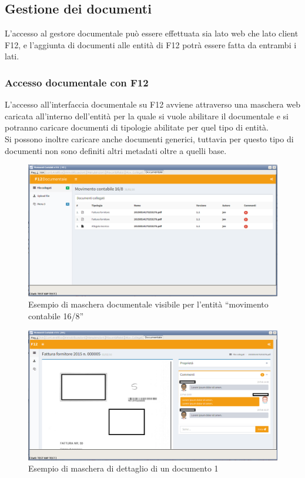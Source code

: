     \subsection{Gestione dei documenti}
    L'accesso al gestore documentale può essere effettuata sia lato web che lato client F12, e l'aggiunta di documenti alle entità di F12 potrà essere fatta da entrambi i lati.
        
        \subsubsection{Accesso documentale con F12}
        L'accesso all'interfaccia documentale su F12 avviene attraverso una maschera web caricata all'interno dell'entità per la quale si vuole abilitare il documentale e si potranno caricare documenti di tipologie abilitate per quel tipo di entità. 
        \\
        Si possono inoltre caricare anche documenti generici, tuttavia per questo tipo di documenti non sono definiti altri metadati oltre a quelli base.
        \begin{figure}[!h] 
            \centering 
            \includegraphics[width=1\columnwidth]{immagini/f12doc/1.png}
            \caption{Esempio di maschera documentale visibile per l'entità “movimento contabile 16/8”}
        \end{figure}
        \begin{figure}[!h] 
            \centering 
            \includegraphics[width=1\columnwidth]{immagini/f12doc/2.png}
            \caption{Esempio di maschera di dettaglio di un documento 1}
        \end{figure}
